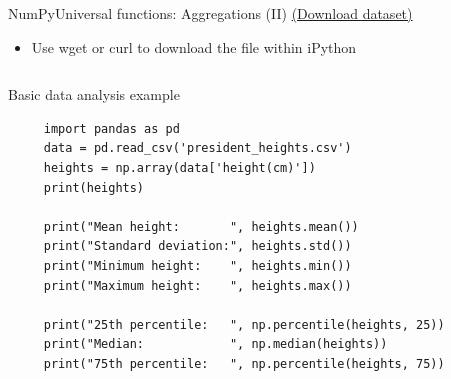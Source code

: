 \documentclass[10pt,compress]{beamer} %
\begin{document}
\begin{frame}[fragile]{NumPy}{Universal functions: Aggregations (II)}
	\href{https://raw.githubusercontent.com/jakevdp/PythonDataScienceHandbook/master/notebooks/data/president\_heights.csv}{(Download dataset)}
	\begin{itemize}
		\item Use wget or curl to download the file within iPython
	\end{itemize}
	\vspace{-0.2cm} 
	\begin{columns}
		\begin{exampleblock}{\footnotesize{Basic data analysis example}}
		\vspace{-0.2cm} 
			\begin{lstlisting}
	 import pandas as pd
	 data = pd.read_csv('president_heights.csv')
	 heights = np.array(data['height(cm)'])
	 print(heights)

	 print("Mean height:       ", heights.mean())
	 print("Standard deviation:", heights.std())
	 print("Minimum height:    ", heights.min())
	 print("Maximum height:    ", heights.max())

	 print("25th percentile:   ", np.percentile(heights, 25))
	 print("Median:            ", np.median(heights))
	 print("75th percentile:   ", np.percentile(heights, 75))
			\end{lstlisting}
		\vspace{-0.2cm} 
		\end{exampleblock}
	\end{columns}

\end{frame}
\end{document}
